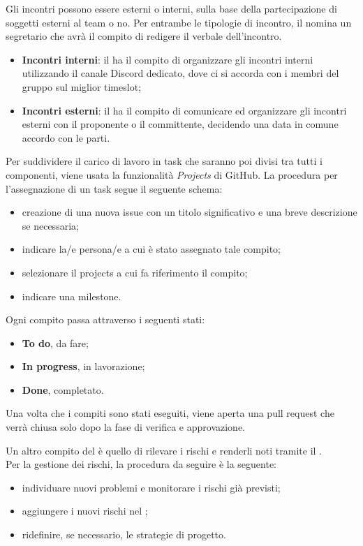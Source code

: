 Gli incontri possono essere esterni o interni, sulla base della partecipazione di soggetti esterni al team o no. Per entrambe le tipologie di incontro, il \respProg{} nomina un segretario che avrà il compito di redigere il verbale dell'incontro.
\begin{itemize}
\item \textbf{Incontri interni}: il \respProg{} ha il compito di organizzare gli incontri interni utilizzando il canale Discord dedicato, dove ci si accorda con i membri del gruppo sul miglior timeslot;
\item \textbf{Incontri esterni}: il \respProg{} ha il compito di comunicare ed organizzare gli incontri esterni con il proponente o il committente, decidendo una data in comune accordo con le parti.
\end{itemize}

Per suddividere il carico di lavoro in task che saranno poi divisi tra tutti i componenti, viene usata la funzionalità \textit{Projects} di GitHub. La procedura per l'assegnazione di un task segue il seguente schema:
\begin{itemize}
\item creazione di una nuova issue con un titolo significativo e una breve descrizione se necessaria;
\item indicare la/e persona/e a cui è stato assegnato tale compito;
\item selezionare il projects a cui fa riferimento il compito;
\item indicare una milestone.
\end{itemize}
Ogni compito passa attraverso i seguenti stati:
\begin{itemize}
\item \textbf{To do}, da fare;
\item \textbf{In progress}, in lavorazione;
\item \textbf{Done}, completato.
\end{itemize}
Una volta che i compiti sono stati eseguiti, viene aperta una pull request che verrà chiusa solo dopo la fase di verifica e approvazione.

Un altro compito del \respProg{} è quello di rilevare i rischi e renderli noti tramite il \PdP. \\
Per la gestione dei rischi, la procedura da seguire è la seguente:
\begin{itemize}
\item individuare nuovi problemi e monitorare i rischi già previsti;
\item aggiungere i nuovi rischi nel \PdP;
\item ridefinire, se necessario, le strategie di progetto.
\end{itemize}
